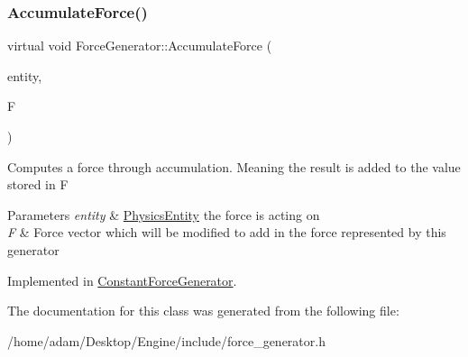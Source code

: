 \subsubsection{\texorpdfstring{Accumulate\+Force()}{AccumulateForce()}}
{\footnotesize\ttfamily virtual void Force\+Generator\+::\+Accumulate\+Force (\begin{DoxyParamCaption}\item[{std\+::shared\+\_\+ptr$<$ \hyperlink{classPhysicsEntity}{Physics\+Entity} $>$}]{entity,  }\item[{Vector3\+Gf \&}]{F }\end{DoxyParamCaption})\hspace{0.3cm}{\ttfamily [pure virtual]}}

Computes a force through accumulation. Meaning the result is added to the value stored in F 
\begin{DoxyParams}{Parameters}
{\em entity} & \hyperlink{classPhysicsEntity}{Physics\+Entity} the force is acting on \\
\hline
{\em F} & Force vector which will be modified to add in the force represented by this generator \\
\hline
\end{DoxyParams}


Implemented in \hyperlink{classConstantForceGenerator_a6a50c67567de9d26073a373aed77d29f}{Constant\+Force\+Generator}.



The documentation for this class was generated from the following file\+:\begin{DoxyCompactItemize}
\item 
/home/adam/\+Desktop/\+Engine/include/force\+\_\+generator.\+h\end{DoxyCompactItemize}
